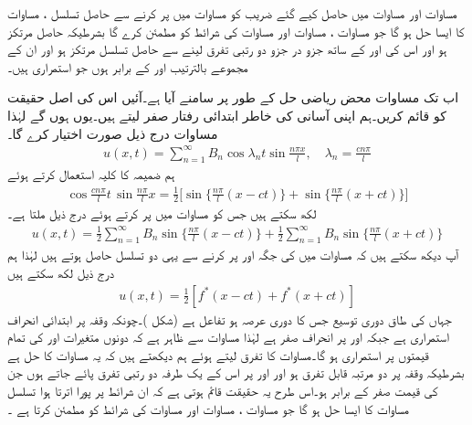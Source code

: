 مساوات  اور مساوات  میں حاصل کیے گئے  ضریب  کو مساوات  میں پر کرنے سے حاصل تسلسل ، مساوات  کا ایسا حل ہو گا جو مساوات ، مساوات  اور مساوات  کی شرائط کو مطمئن کرے گا بشرطیکہ  حاصل  مرتکز ہو اور اس  کی  اور  کے ساتھ جزو در جزو  دو  رتبی تفرق لینے سے حاصل تسلسل مرتکز   ہو اور ان کے مجموعے  بالترتیب  اور  کے برابر ہوں جو استمراری ہیں۔

اب تک مساوات  محض ریاضی حل کے طور پر سامنے آیا ہے۔آئیں اس کی اصل حقیقت کو قائم کریں۔ہم اپنی آسانی کی خاطر ابتدائی رفتار  صفر لیتے ہیں۔یوں  ہوں  گے لہٰذا مساوات  درج ذیل صورت اختیار کرے گا۔
\begin{align}\label{مساوات_جزوی_متحرک_موج_الف}
u(x,t)=\sum_{n=1}^{\infty} B_n\cos \lambda_n t\sin\frac{n\pi x}{l},\quad \lambda_n=\frac{cn\pi}{l}
\end{align}
ہم ضمیمہ  کا کلیہ  استعمال کرتے ہوئے
\begin{align*}
\cos \frac{cn\pi}{l}t\,\sin\frac{n\pi}{l}x=\frac{1}{2}\big[\sin\big\{\frac{n\pi}{l}(x-ct)\big\}+\sin\big\{\frac{n\pi}{l}(x+ct)\big\}\big]
\end{align*}
لکھ سکتے ہیں جس کو  مساوات   میں پر کرتے ہوئے درج ذیل ملتا ہے۔
\begin{align*}
u(x,t)=\frac{1}{2}\sum_{n=1}^{\infty}B_n \sin\big\{\frac{n\pi}{l}(x-ct)\big\}+\frac{1}{2}\sum_{n=1}^{\infty}B_n \sin\big\{\frac{n\pi}{l}(x+ct)\big\}
\end{align*}
آپ دیکھ سکتے ہیں کہ مساوات  میں  کی جگہ  اور  پر کرنے سے یہی دو تسلسل حاصل ہوتے ہیں لہٰذا ہم درج ذیل لکھ سکتے ہیں
\begin{align}\label{مساوات_جزوی_متحرک_موج_ب}
u(x,t)=\frac{1}{2}[f^*(x-ct)+f^*(x+ct)]
\end{align}
جہاں  کی طاق دوری توسیع جس کا دوری عرصہ  ہو تفاعل  ہے (شکل )۔چونکہ وقفہ  پر ابتدائی انحراف  استمراری ہے جبکہ   اور  پر انحراف صفر ہے لہٰذا مساوات  سے ظاہر ہے کہ  دونوں متغیرات  اور  کی تمام قیمتوں پر استمراری ہو گا۔مساوات  کا تفرق لیتے ہوئے ہم دیکھتے ہیں کہ یہ مساوات  کا حل ہے بشرطیکہ  وقفہ  پر  دو مرتبہ قابل تفرق ہو اور  اور  پر اس کے یک طرفہ دو رتبی تفرق پائے جاتے ہوں جن کی قیمت صفر کے برابر ہو۔اس طرح یہ حقیقت قائم ہوتی ہے کہ ان شرائط پر پورا اترتا ہوا تسلسل  مساوات  کا ایسا حل ہو گا جو  مساوات ، مساوات  اور مساوات  کی شرائط کو مطمئن کرتا ہے ۔
